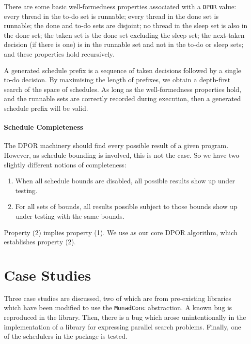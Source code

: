 There are some basic well-formedness properties associated with a
\verb|DPOR| value: every thread in the to-do set is runnable; every
thread in the done set is runnable; the done and to-do sets are
disjoint; no thread in the sleep set is also in the done set; the
taken set is the done set excluding the sleep set; the next-taken
decision (if there is one) is in the runnable set and not in the to-do
or sleep sets; and these properties hold recursively.

A generated schedule prefix is a sequence of taken decisions followed
by a single to-do decision.  By maximising the length of prefixes, we
obtain a depth-first search of the space of schedules.  As long as the
well-formedness properties hold, and the runnable sets are correctly
recorded during execution, then a generated schedule prefix will be
valid.

\paragraph{Schedule Completeness}
The DPOR machinery should find every possible result of a given
program.  However, as schedule bounding is involved, this is not the
case.  So we have two slightly different notions of completeness:

\begin{enumerate}
\item When all schedule bounds are disabled, all possible results show
  up under testing.
\item For all sets of bounds, all results possible subject to those
  bounds show up under testing with the same bounds.
\end{enumerate}

Property (2) implies property (1).  We use \cite{coons2013} as our
core DPOR algorithm, which establishes property (2).

\section{Case Studies}
\label{sec:dejafu-casestudies}

Three case studies are discussed, two of which are from pre-existing
libraries which have been modified to use the \verb|MonadConc|
abstraction.  A known bug is reproduced in the 
library.  Then, there is a bug which arose unintentionally in the
implementation of a library for expressing parallel search problems.
Finally, one of the schedulers in the  package is
tested.

